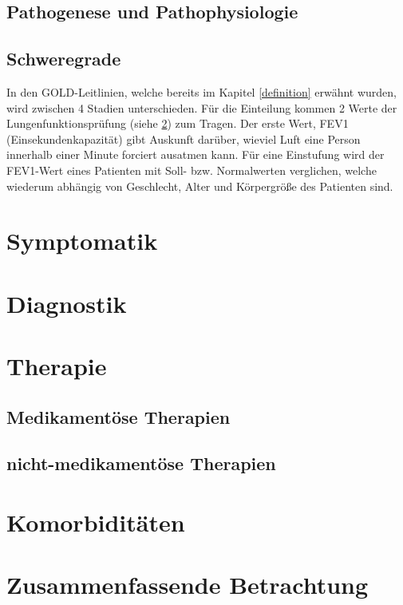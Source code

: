 \subsection{Pathogenese und Pathophysiologie}
\label{pathogenese}

\subsection{Schweregrade}
\label{schweregrade}
In den GOLD-Leitlinien, welche bereits im Kapitel \ref{definition} erwähnt wurden, wird zwischen 4 Stadien unterschieden. Für die Einteilung kommen 2 Werte der Lungenfunktionsprüfung (siehe \ref{diagnostik}) zum Tragen. Der erste Wert, FEV1 (Einsekundenkapazität) gibt Auskunft darüber, wieviel Luft eine Person innerhalb einer Minute forciert ausatmen kann. Für eine Einstufung wird der FEV1-Wert eines Patienten mit Soll- bzw. Normalwerten verglichen, welche wiederum abhängig von Geschlecht, Alter und Körpergröße des Patienten sind.

\section{Symptomatik}
\label{symptomatik}

\section{Diagnostik}
\label{diagnostik}

\section{Therapie}
\label{therapie}

\subsection{Medikamentöse Therapien}
\label{medikamtentöse therapien}

\subsection{nicht-medikamentöse Therapien}
\label{nicht-medikamentöse therapien}

\section{Komorbiditäten}
\label{komorbiditäten}


\section{Zusammenfassende Betrachtung}
\label{zusammenfassende betrachtung}

\newpage\thispagestyle{empty}
